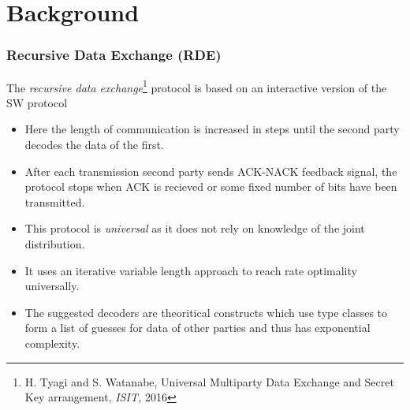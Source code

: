 \documentclass[xcolor=dvipsnames]{beamer}
\begin{document}
\section{Background}

\begin{frame}[label = rde]
\frametitle{Recursive Data Exchange (RDE)}
The \emph{recursive data exchange}\footnote{\tiny H. Tyagi and S. Watanabe, Universal Multiparty Data Exchange and Secret Key arrangement, \textit{ISIT,} 2016} protocol is based on an interactive version of the SW protocol 
\begin{itemize}
\item Here the length of communication is increased in steps until the second party decodes the data of the first.
\item After each transmission second party sends ACK-NACK feedback signal, the protocol stops when ACK is recieved or some fixed number of bits have been transmitted.
\item This protocol is \emph{universal} as it does not rely on knowledge of the joint distribution.
\item It uses an iterative variable length approach to reach rate optimality universally. 
\item The suggested decoders are theoritical constructs which use type classes to form a list of guesses for data of other parties and thus has exponential complexity.
\end{itemize}
\end{frame}
\end{document}
